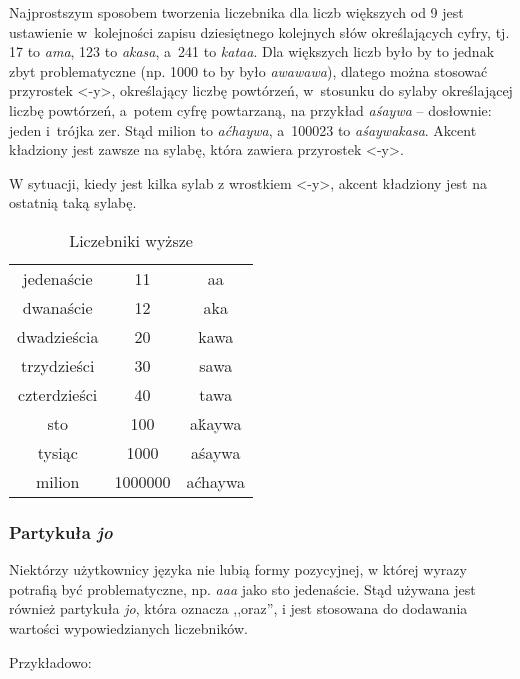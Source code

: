 \begin{spacing}{1.1}
Najprostszym sposobem tworzenia liczebnika dla liczb większych od 9 jest 
ustawienie w~kolejności zapisu dziesiętnego kolejnych słów określających cyfry,
tj. 17 to \emph{ama}, 123 to \emph{akasa}, a~241 to \emph{kataa}. Dla większych
liczb było by to jednak zbyt problematyczne (np. 1000 to by było 
\emph{awawawa}), dlatego można stosować przyrostek <-y>, określający liczbę 
powtórzeń, w~stosunku do sylaby określającej liczbę powtórzeń, a~potem cyfrę 
powtarzaną, na przykład \emph{aśaywa} -- dosłownie: jeden i~trójka zer. Stąd 
milion to \emph{aćhaywa}, a~100023 to \emph{aśaywakasa}. Akcent kładziony jest 
zawsze na sylabę, która zawiera przyrostek <-y>.

W sytuacji, kiedy jest kilka sylab z wrostkiem <-y>, akcent kładziony jest na
ostatnią taką sylabę.

\begin{table}[h]
	\centering
	\caption{Liczebniki wyższe}
	\begin{tabular}{ccc} \toprule
		jedenaście & 11 & aa \\
		dwanaście & 12 & aka \\
		dwadzieścia & 20 & kawa \\
		trzydzieści & 30 & sawa \\
		czterdzieści & 40 & tawa \\
		sto & 100 & aḱaywa  \\
		tysiąc & 1000 & aśaywa \\
		milion & 1000000 & aćhaywa \\\bottomrule
	\end{tabular}
	\label{tab:chars}
\end{table}

\subsubsection{Partykuła \emph{jo}}

Niektórzy użytkownicy języka nie lubią formy pozycyjnej, w której wyrazy potrafią
być problematyczne, np. \emph{aaa} jako sto jedenaście. Stąd używana jest również
partykuła \emph{jo}, która oznacza ,,oraz'', i jest stosowana do dodawania
wartości wypowiedzianych liczebników.

Przykładowo:





\end{spacing}
